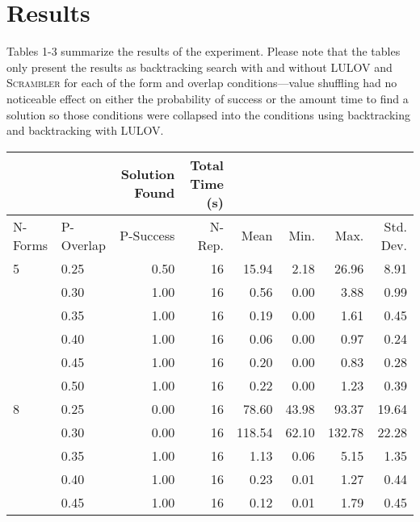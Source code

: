 \documentclass[11pt]{article}
\begin{document}
\section{Results}
Tables 1-3 summarize the results of the experiment. Please note that
the tables only present the results as backtracking search with and
without LULOV and \textsc{Scrambler} for each of the form and overlap
conditions---value shuffling had no noticeable effect on either the
probability of success or the amount time to find a solution so those
conditions were collapsed into the conditions using backtracking and
backtracking with LULOV.
\par
\begin{table}
  \begin{tabular}{llrrrrrr}
    \toprule[1.5pt]
    &      & Solution Found & Total Time (s) &        &        &        &           \\
    \midrule
    N-Forms &P-Overlap  &       P-Success &              N-Rep. &   Mean &   Min. &   Max. & Std. Dev. \\
    \bottomrule[1.25pt]
    5  & 0.25 &           0.50 &             16 &  15.94 &   2.18 &  26.96 &      8.91 \\
    & 0.30 &           1.00 &             16 &   0.56 &   0.00 &   3.88 &      0.99 \\
    & 0.35 &           1.00 &             16 &   0.19 &   0.00 &   1.61 &      0.45 \\
    & 0.40 &           1.00 &             16 &   0.06 &   0.00 &   0.97 &      0.24 \\
    & 0.45 &           1.00 &             16 &   0.20 &   0.00 &   0.83 &      0.28 \\
    & 0.50 &           1.00 &             16 &   0.22 &   0.00 &   1.23 &      0.39 \\
    \midrule
    8  & 0.25 &           0.00 &             16 &  78.60 &  43.98 &  93.37 &     19.64 \\
    & 0.30 &           0.00 &             16 & 118.54 &  62.10 & 132.78 &     22.28 \\
    & 0.35 &           1.00 &             16 &   1.13 &   0.06 &   5.15 &      1.35 \\
    & 0.40 &           1.00 &             16 &   0.23 &   0.01 &   1.27 &      0.44 \\
    & 0.45 &           1.00 &             16 &   0.12 &   0.01 &   1.79 &      0.45 \\

\end{tabular}
\end{table}
\end{document}
